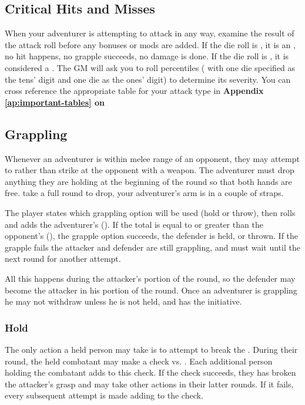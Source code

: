 \begin{multicols*}{2}
\subsection{Critical Hits and Misses}
When your adventurer is attempting to attack in any way, examine the result of the attack roll before any bonuses or mods are added. If the die roll is , it is an , no hit happens, no grapple succeeds, no damage is
done. If the die roll is , it is considered a . The GM will ask you to roll percentiles ( with one die specified as the tens' digit and one die as the ones' digit) to determine its severity. You can cross reference the appropriate table for your attack type in \textbf{Appendix \ref{ap:important-tables} on }
\subsection{Grappling}
Whenever an adventurer is within melee range of an opponent, they may attempt to  rather than strike at the opponent with a weapon. The adventurer must drop anything they are holding at the beginning of the round so that both hands are free.  take a full round to drop, your adventurer's arm is in a couple of straps.

The player states which grappling option will be used (hold or throw), then rolls  and adds the adventurer's  (\GM). If the total is equal to or greater than the opponent's  (\GDV), the grapple option succeeds, the defender is held, or thrown. If the grapple fails the attacker and defender are still grappling, and must wait until the next round for another attempt.

All this happens during the attacker's portion of the round, so the defender may become the attacker in his portion of the round. Once an adventurer is grappling he may not withdraw unless he is not held, and has the initiative.
\subsubsection{Hold}
The only action a held person may take is to attempt to break the . During their round, the held combatant may make a  check vs. \STR. Each additional person holding the combatant adds  to this \STR check. If the check succeeds, they has broken the attacker's grasp and may take other actions in their latter rounds. If it fails, every subsequent attempt is made adding  to the \STR check.

\end{multicols*}
